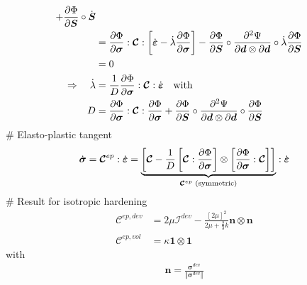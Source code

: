 \documentclass[]{scrartcl}
\begin{document}
\begin{easylist}
\begin{align*}
  + \frac{\partial \Phi}{\partial \boldsymbol{S}} \circ \dot{\boldsymbol{S}} \\
 &= \frac{\partial \Phi}{\partial \boldsymbol{\sigma}} : \boldsymbol{\mathcal{C}} : \left[ \dot{\boldsymbol{\varepsilon}} - \dot{\lambda} \frac{\partial \Phi}{\partial \boldsymbol{\sigma}} \right]
  -  \frac{\partial \Phi}{\partial \boldsymbol{S}} \circ \frac{\partial^{2} \Psi}{\partial \boldsymbol{d} \otimes \partial \boldsymbol{d}} \circ \dot{\lambda} \frac{\partial \Phi}{\partial \boldsymbol{S}} \\
 &= 0 \\
\Rightarrow \quad 
\dot{\lambda}
  &= \frac{1}{D} \frac{\partial \Phi}{\partial \boldsymbol{\sigma}} : \boldsymbol{\mathcal{C}} : \dot{\boldsymbol{\varepsilon}}
\quad \textnormal{with} \\
D 
  &= \frac{\partial \Phi}{\partial \boldsymbol{\sigma}} : \boldsymbol{\mathcal{C}} : \frac{\partial \Phi}{\partial \boldsymbol{\sigma}}
  + \frac{\partial \Phi}{\partial \boldsymbol{S}} \circ \frac{\partial^{2} \Psi}{\partial \boldsymbol{d} \otimes \partial \boldsymbol{d}} \circ \frac{\partial \Phi}{\partial \boldsymbol{S}}
\end{align*}
# Elasto-plastic tangent
\begin{gather*}
\dot{\boldsymbol{\sigma}} 
  = \boldsymbol{\mathcal{C}}^{ep} : \dot{\boldsymbol{\varepsilon}}
  = \underbrace{\left[ \boldsymbol{\mathcal{C}} - \frac{1}{D} \left[ \boldsymbol{\mathcal{C}} : \frac{\partial \Phi}{\partial \boldsymbol{\sigma}} \right] \otimes \left[ \frac{\partial \Phi}{\partial \boldsymbol{\sigma}} : \boldsymbol{\mathcal{C}} \right] \right]}_{\boldsymbol{\mathcal{C}}^{ep} \textnormal{ (symmetric)}} : \dot{\boldsymbol{\varepsilon}}
\end{gather*}
# Result for isotropic hardening
\begin{subequations}
\begin{align}
\boldsymbol{\mathcal{C}}^{ep, dev}
 &= 2 \mu \boldsymbol{\mathcal{I}}^{dev} - \frac{\left[ 2\mu \right]^{2}}{2\mu + \frac{2}{3}k} \boldsymbol{n} \otimes \boldsymbol{n} \\
\boldsymbol{\mathcal{C}}^{ep, vol}
 &= \kappa \boldsymbol{1} \otimes \boldsymbol{1}
 \label{equ: Constutitve law: Algorithmically correct tangent: Volumetric}
\end{align}
\end{subequations}
with
\begin{gather*}
\boldsymbol{n}
  = \frac{\boldsymbol{\sigma}^{dev}}{\Vert \boldsymbol{\sigma}^{dev} \Vert}
\end{gather*}
\end{easylist}
\end{document}

